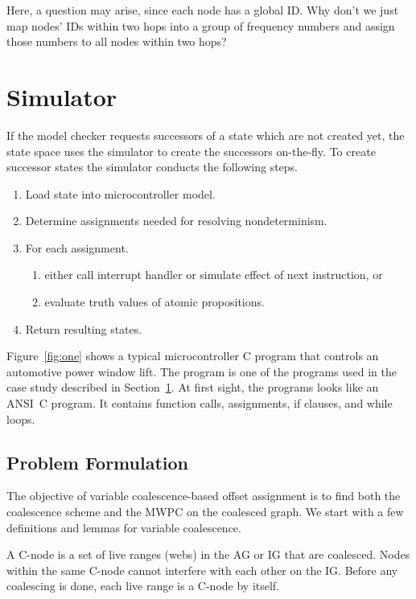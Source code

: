\documentclass[format=acmsmall, review=false]{acmart}
\begin{document}
Here, a question may arise, since each node has a global ID. Why
don't we just map nodes' IDs within two hops into a group of
frequency numbers and assign those numbers to all nodes within two
hops?

\section{Simulator}
\label{sec:sim}

If the model checker requests successors of a state which are not
created yet, the state space uses the simulator to create the
successors on-the-fly. To create successor states the simulator
conducts the following steps.
\begin{enumerate}
	\item Load state into microcontroller model.
	\item Determine assignments needed for resolving nondeterminism.
	\item For each assignment.
	\begin{enumerate}
		\item either call interrupt handler or simulate effect of next instruction, or
		\item evaluate truth values of atomic propositions.
	\end{enumerate}
	\item Return resulting states.
\end{enumerate}
Figure~\ref{fig:one} shows a typical microcontroller C program that
controls an automotive power window lift. The program is one of the
programs used in the case study described in Section~\ref{sec:sim}.
At first sight, the programs looks like an ANSI~C program. It
contains function calls, assignments, if clauses, and while loops.

\subsection{Problem Formulation}

The objective of variable coalescence-based offset assignment is to find
both the coalescence scheme and the MWPC on the coalesced graph. We start
with a few definitions and lemmas for variable coalescence.

\begin{definition}A C-node is a set of
	live ranges (webs) in the AG or IG that are coalesced. Nodes within the same
	C-node cannot interfere with each other on the IG. Before any coalescing is
	done, each live range is a C-node by itself.
\end{definition}
\end{document}
